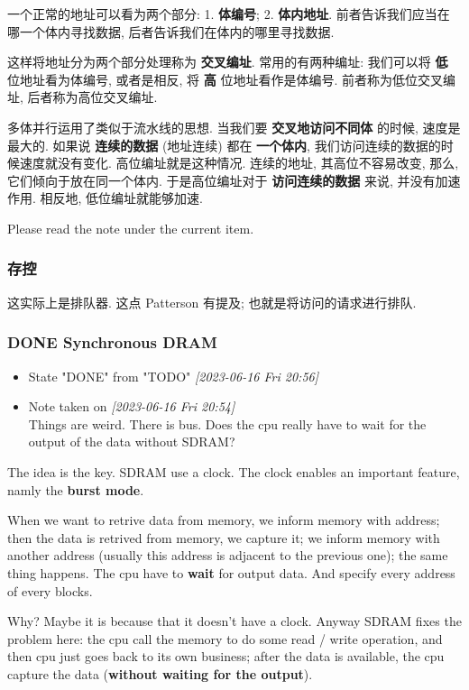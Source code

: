 \documentclass[11pt]{article}
\begin{document}
一个正常的地址可以看为两个部分: 1. \textbf{体编号}; 2. \textbf{体内地址}. 前者告诉我们应当在哪一个体内寻找数据, 后者告诉我们在体内的哪里寻找数据.

这样将地址分为两个部分处理称为 \textbf{交叉编址}. 常用的有两种编址: 我们可以将 \textbf{低} 位地址看为体编号, 或者是相反, 将 \textbf{高} 位地址看作是体编号. 前者称为低位交叉编址, 后者称为高位交叉编址. 

多体并行运用了类似于流水线的思想. 当我们要 \textbf{交叉地访问不同体} 的时候, 速度是最大的. 如果说 \textbf{连续的数据} (地址连续) 都在 \textbf{一个体内}, 我们访问连续的数据的时候速度就没有变化. 高位编址就是这种情况. 连续的地址, 其高位不容易改变, 那么, 它们倾向于放在同一个体内. 于是高位编址对于 \textbf{访问连续的数据} 来说, 并没有加速作用. 相反地, 低位编址就能够加速.

Please read the note under the current item.
\subsubsection{存控}
\label{sec:orgfc5a7a5}

这实际上是排队器. 这点 Patterson 有提及; 也就是将访问的请求进行排队.

\subsubsection{{\bfseries\sffamily DONE} Synchronous DRAM}
\label{sec:org367597d}
\begin{itemize}
\item State "DONE"       from "TODO"       \textit{[2023-06-16 Fri 20:56]}

\item Note taken on \textit{[2023-06-16 Fri 20:54] } \\
Things are weird. There is bus. Does the cpu really have to wait for the output of the data without SDRAM?
\end{itemize}

The idea is the key. SDRAM use a clock. The clock enables an important feature, namly the \textbf{burst mode}. 

When we want to retrive data from memory, we inform memory with address; then the data is retrived from memory, we capture it; we inform memory with another address (usually this address is adjacent to the previous one); the same thing happens. The cpu have to \textbf{wait} for output data. And specify every address of every blocks.

Why? Maybe it is because that it doesn't have a clock. Anyway SDRAM fixes the problem here: the cpu call the memory to do some read / write operation, and then cpu just goes back to its own business; after the data is available, the cpu capture the data (\textbf{without waiting for the output}).
\end{document}

